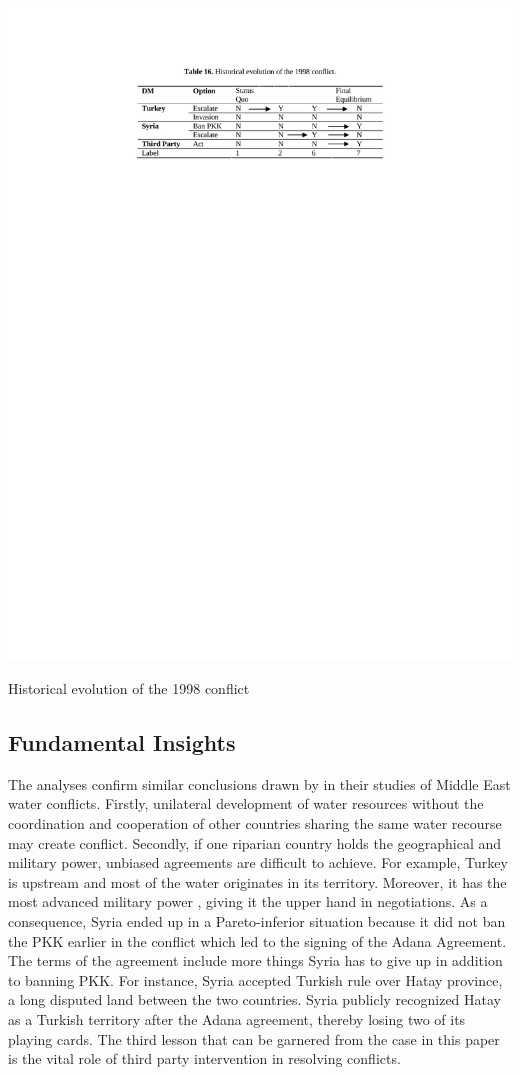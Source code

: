 \documentclass[letterpaper,12pt,titlepage,oneside,final]{book}
\begin{document}
\begin{table}[H]
\centering
\includegraphics[scale=1]{PDF-IMG/tables/16.pdf}

\caption{Historical evolution of the 1998 conflict}

\label{tbl:t16}
\end{table}

\subsection{Fundamental Insights}
The analyses confirm similar conclusions drawn by \citet{priscoli2009managing} in their studies of Middle East water conflicts. Firstly, unilateral development of water resources without the coordination and cooperation of other countries sharing the same water recourse may create conflict. Secondly, if one riparian country holds the geographical and military power, unbiased agreements are difficult to achieve. For example, Turkey is upstream and most of the water originates in its territory. Moreover, it has the most advanced military power \citep{priscoli2009managing}, giving it the upper hand in negotiations. As a consequence, Syria ended up in a Pareto-inferior situation because it did not ban the PKK earlier in the conflict which led to the signing of the Adana Agreement. The terms of the agreement include more things Syria has to give up in addition to banning PKK. For instance, Syria accepted Turkish rule over Hatay province, a long disputed land between the two countries. Syria publicly recognized Hatay as a Turkish territory after the Adana agreement, thereby losing two of its playing cards. The third lesson that can be garnered from the case in this paper is the vital role of third party intervention in resolving conflicts.
\end{document}
